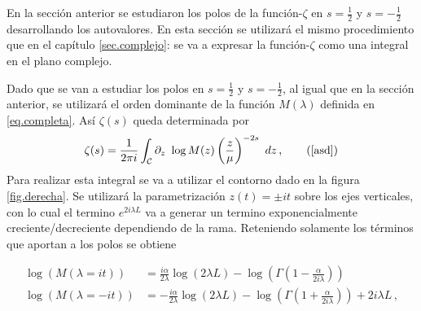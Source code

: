 En la sección anterior se estudiaron los polos de la función-$\zeta$ en $s=\frac{1}{2}$ y $s=-\frac{1}{2}$ desarrollando los autovalores.
En esta sección se utilizará el mismo procedimiento que en el capítulo \ref{sec.complejo}: se va a expresar la función-$\zeta $ como una integral en el plano complejo.

Dado que se van a estudiar los polos en $s= \frac{1}{2}$ y $s=- \frac{1}{2}$, al igual que en la sección anterior, se utilizará el orden dominante de la función $M ( \lambda )$ definida en \eqref{eq.completa}. Así
$ \zeta (s)$ queda determinada por
\begin{equation}
\zeta (s) = 
\frac{1}{2 \pi i} 
\int _{\mathcal{C}}
\partial _z \ \log 	M(z)  \left( \frac{z}{\mu} \right) ^{-2s} \ dz
	\, ,
	\tag{\ref{asd}}
\end{equation}
Para realizar esta integral se va a utilizar el contorno dado en la figura \ref{fig.derecha}. Se utilizará la parametrización $ z (t) = \pm i t$ sobre los ejes verticales, con lo cual el termino $e ^{2 i \lambda L}$ va a generar un termino exponencialmente creciente/decreciente dependiendo de la rama. Reteniendo solamente los términos que aportan a los polos se obtiene
\begin{comment}
\begin{equation}
\begin{array}{c}
    \zeta  (s) = \\
     \frac{1}{2 \pi i} \int _{\infty} ^{1}
     \frac{ i \alpha }{2 t^2} 
     \left(
      1 + \frac{i \pi}{2} + Ln[2 t] + \psi (1 + \frac{\beta}{2 t})
     \right)
     t ^{-2s}
     e ^{- i \pi s} (i dt) + \\
     \frac{1}{2 \pi i} \int _{\infty} ^{1} 
     \left(
     2 + \frac{\beta}{2 t^2}
     \left(
     1 + \frac{i \pi}{2} - Ln[2 t] - \psi (1+ \frac{\beta}{2 t})
     \right)
     t ^{-2s}
     e ^{ i \pi s} (-i dt)
     \right)     
\end{array}
\end{equation}
\end{comment}
\begin{align}\label{eq.logatirmos}
\log ( M ( \lambda = i t ) ) &=   
\frac{i \alpha }{2 \lambda}  \log (2 \lambda L) - 
 \log \left( \Gamma \left( 1 - \frac{ \alpha}{2 i \lambda} \right) \right) \\ 
\log ( M ( \lambda=-i t ) ) &=   -  
\frac{i \alpha }{2 \lambda}  \log ( 2 \lambda L ) - 
 \log \left( \Gamma \left( 1 + \frac{ \alpha}{2 i \lambda} \right) \right) +
2 i \lambda L  \nonumber
	\,	,
\end{align}
